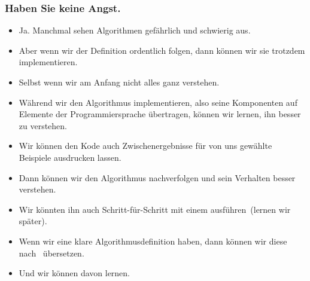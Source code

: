 \documentclass[aspectratio=169,mathserif,notheorems]{beamer}%
\begin{document}
%
\begin{frame}%
\frametitle{Haben Sie keine Angst.}%
\begin{itemize}%
%
%
%
%
%
%
%
%
\item<5-> Ja. Manchmal sehen Algorithmen gefährlich und schwierig aus.%
%
\item<6-> Aber wenn wir der Definition ordentlich folgen, dann können wir sie trotzdem implementieren.%
%
\item<7-> Selbst wenn wir am Anfang nicht alles ganz verstehen.%
%
\item<8-> Während wir den Algorithmus implementieren, also seine Komponenten auf Elemente der Programmiersprache übertragen, können wir lernen, ihn besser zu verstehen.%
%
\item<9-> Wir können den Kode auch Zwischenergebnisse für von uns gewählte Beispiele ausdrucken lassen.%
%
\item<10-> Dann können wir den Algorithmus nachverfolgen und sein Verhalten besser verstehen.%
%
\item<11-> Wir könnten ihn auch Schritt-für-Schritt mit einem  ausführen~(lernen wir später).%
%
\item<12-> Wenn wir eine klare Algorithmusdefinition haben, dann können wir diese nach \python\ übersetzen.%
%
\item<13-> Und wir können davon lernen.%
\end{itemize}%
\end{frame}%
%
%
\end{document}
